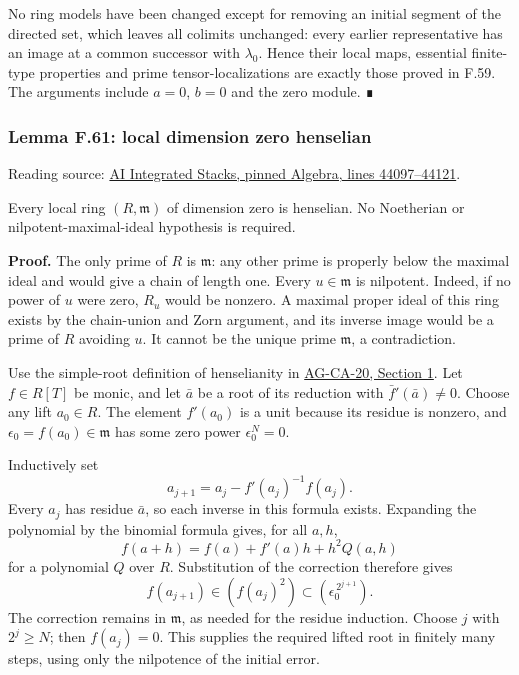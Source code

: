 \documentclass[11pt,a4paper,openany]{report}
\begin{document}
No ring models have been changed except for removing an initial segment of the directed set, which leaves all colimits unchanged: every earlier representative has an image at a common successor with \(\lambda_0\). Hence their local maps, essential finite-type properties and prime tensor-localizations are exactly those proved in F.59. The arguments include \(a=0\), \(b=0\) and the zero module. ∎

\label{AG-RG-S05-algebra-lemma-local-dimension-zero-henselian}

\subsubsection{Lemma F.61: local dimension zero henselian}\label{AG-RG-S05-lemma-f.61-local-dimension-zero-henselian}

Reading source: \href{https://github.com/KokunoYumeto/unofficial-stacks-project-ai-drafts/blob/565b10e987aba5969b21145a0833f42d69f96790/algebra.tex\#L44097-L44121}{AI Integrated Stacks, pinned Algebra, lines 44097--44121}.

Every local ring \((R,\mathfrak m)\) of dimension zero is henselian. No Noetherian or nilpotent-maximal-ideal hypothesis is required.

\textbf{Proof.} The only prime of \(R\) is \(\mathfrak m\): any other prime is properly below the maximal ideal and would give a chain of length one. Every \(u\in\mathfrak m\) is nilpotent. Indeed, if no power of \(u\) were zero, \(R_u\) would be nonzero. A maximal proper ideal of this ring exists by the chain-union and Zorn argument, and its inverse image would be a prime of \(R\) avoiding \(u\). It cannot be the unique prime \(\mathfrak m\), a contradiction.

Use the simple-root definition of henselianity in \href{https://github.com/KokunoYumeto/open-math-courses/blob/main/docs/courses/AG-CA/henselian-local-rings-and-henselization.html}{AG-CA-20, Section 1}. Let \(f\in R[T]\) be monic, and let \(\bar a\) be a root of its reduction with \(\bar f'(\bar a)\ne0\). Choose any lift \(a_0\in R\). The element \(f'(a_0)\) is a unit because its residue is nonzero, and \(\epsilon_0=f(a_0)\in\mathfrak m\) has some zero power \(\epsilon_0^N=0\).

Inductively set \[a_{j+1}=a_j-f'(a_j)^{-1}f(a_j).\] Every \(a_j\) has residue \(\bar a\), so each inverse in this formula exists. Expanding the polynomial by the binomial formula gives, for all \(a,h\), \[f(a+h)=f(a)+f'(a)h+h^2Q(a,h)\] for a polynomial \(Q\) over \(R\). Substitution of the correction therefore gives \[f(a_{j+1})\in(f(a_j)^2)
\subset(\epsilon_0^{\,2^{j+1}}).\] The correction remains in \(\mathfrak m\), as needed for the residue induction. Choose \(j\) with \(2^j\geq N\); then \(f(a_j)=0\). This supplies the required lifted root in finitely many steps, using only the nilpotence of the initial error.
\end{document}

